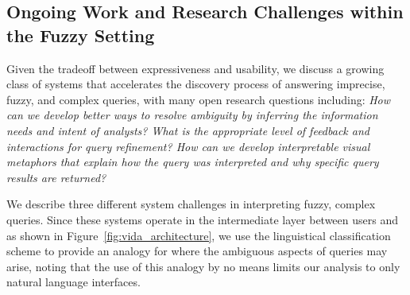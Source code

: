 
\subsection{Ongoing Work and Research Challenges within the Fuzzy Setting}
\par Given the tradeoff between expressiveness and usability, we discuss a growing class of systems that accelerates the discovery process of answering imprecise, fuzzy, and complex queries, with many open research questions including: {\em How can we develop better ways to resolve ambiguity by inferring the information needs and intent of analysts? What is the appropriate level of feedback and interactions for query refinement? How can we develop interpretable visual metaphors that explain how the query was interpreted and why specific query results are returned?} 

We describe three different system challenges in interpreting fuzzy, complex queries. Since these systems operate in the intermediate layer between users and \vidaql as shown in Figure~\ref{fig:vida_architecture}, we use the linguistical classification scheme to provide an analogy for where the ambiguous aspects of queries may arise, noting that the use of this analogy by no means limits our analysis to only natural language interfaces.

